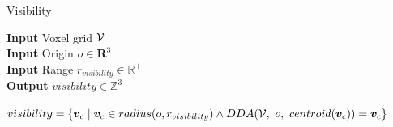 \begin{algorithm}
    \caption{Visibility}
    \hspace*{\algorithmicindent} \textbf{Input} Voxel grid \(\mathcal{V}\) \\
    \hspace*{\algorithmicindent} \textbf{Input} Origin \(o \in \mathbf{R}^3\) \\
    \hspace*{\algorithmicindent} \textbf{Input} Range \(r_{visibility} \in \mathbb{R}^+\) \\
    \hspace*{\algorithmicindent} \textbf{Output} $visibility \in \mathbb{Z}^{3}$ \\
    
    \begin{algorithmic}

    \State $visibility = \{\boldsymbol{v}_c \mid \boldsymbol{v}_c \in radius(o, r_{visibility}) \land DDA(\mathcal{V},\ o,\ centroid(\boldsymbol{v}_c)) = \boldsymbol{v}_c\}$

    \end{algorithmic}
\end{algorithm}


